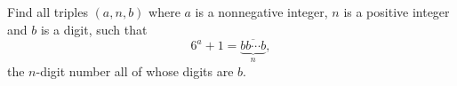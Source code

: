 Find all triples $(a,n,b)$ where $a$ is a nonnegative integer, $n$ is a positive integer and $b$ is a digit, such that
\[
6^a+1=\overline{\underbrace{bb\cdots b}_{n}},
\]
the $n$-digit number all of whose digits are $b$.
